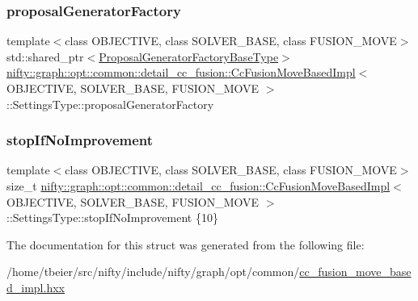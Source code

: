 \subsubsection{\texorpdfstring{proposal\+Generator\+Factory}{proposalGeneratorFactory}}
{\footnotesize\ttfamily template$<$class O\+B\+J\+E\+C\+T\+I\+VE, class S\+O\+L\+V\+E\+R\+\_\+\+B\+A\+SE, class F\+U\+S\+I\+O\+N\+\_\+\+M\+O\+VE$>$ \\
std\+::shared\+\_\+ptr$<$\hyperlink{classnifty_1_1graph_1_1opt_1_1common_1_1detail__cc__fusion_1_1CcFusionMoveBasedImpl_a5b8c102a697bde14691f87816956af00}{Proposal\+Generator\+Factory\+Base\+Type}$>$ \hyperlink{classnifty_1_1graph_1_1opt_1_1common_1_1detail__cc__fusion_1_1CcFusionMoveBasedImpl}{nifty\+::graph\+::opt\+::common\+::detail\+\_\+cc\+\_\+fusion\+::\+Cc\+Fusion\+Move\+Based\+Impl}$<$ O\+B\+J\+E\+C\+T\+I\+VE, S\+O\+L\+V\+E\+R\+\_\+\+B\+A\+SE, F\+U\+S\+I\+O\+N\+\_\+\+M\+O\+VE $>$\+::Settings\+Type\+::proposal\+Generator\+Factory}

\mbox{\label{structnifty_1_1graph_1_1opt_1_1common_1_1detail__cc__fusion_1_1CcFusionMoveBasedImpl_1_1SettingsType_af0466c3e3f184877959cf3b83f19ed7d}} 
\subsubsection{\texorpdfstring{stop\+If\+No\+Improvement}{stopIfNoImprovement}}
{\footnotesize\ttfamily template$<$class O\+B\+J\+E\+C\+T\+I\+VE, class S\+O\+L\+V\+E\+R\+\_\+\+B\+A\+SE, class F\+U\+S\+I\+O\+N\+\_\+\+M\+O\+VE$>$ \\
size\+\_\+t \hyperlink{classnifty_1_1graph_1_1opt_1_1common_1_1detail__cc__fusion_1_1CcFusionMoveBasedImpl}{nifty\+::graph\+::opt\+::common\+::detail\+\_\+cc\+\_\+fusion\+::\+Cc\+Fusion\+Move\+Based\+Impl}$<$ O\+B\+J\+E\+C\+T\+I\+VE, S\+O\+L\+V\+E\+R\+\_\+\+B\+A\+SE, F\+U\+S\+I\+O\+N\+\_\+\+M\+O\+VE $>$\+::Settings\+Type\+::stop\+If\+No\+Improvement \{10\}}



The documentation for this struct was generated from the following file\+:\begin{DoxyCompactItemize}
\item 
/home/tbeier/src/nifty/include/nifty/graph/opt/common/\hyperlink{cc__fusion__move__based__impl_8hxx}{cc\+\_\+fusion\+\_\+move\+\_\+based\+\_\+impl.\+hxx}\end{DoxyCompactItemize}
